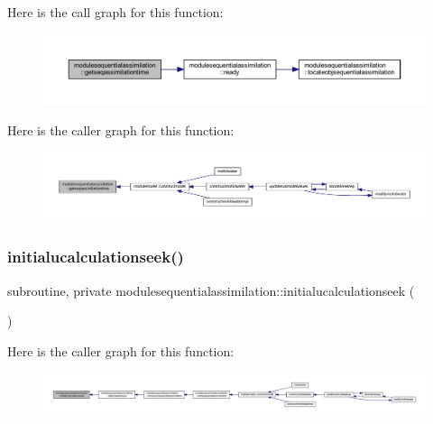 Here is the call graph for this function\+:\nopagebreak
\begin{figure}[H]
\begin{center}
\leavevmode
\includegraphics[width=350pt]{namespacemodulesequentialassimilation_a79adcfc8fb983a24237bd6bba818eca8_cgraph}
\end{center}
\end{figure}
Here is the caller graph for this function\+:\nopagebreak
\begin{figure}[H]
\begin{center}
\leavevmode
\includegraphics[width=350pt]{namespacemodulesequentialassimilation_a79adcfc8fb983a24237bd6bba818eca8_icgraph}
\end{center}
\end{figure}
\mbox{\label{namespacemodulesequentialassimilation_a33c7157ae5930272ff775ccd732bcb33}} 
\subsubsection{\texorpdfstring{initialucalculationseek()}{initialucalculationseek()}}
{\footnotesize\ttfamily subroutine, private modulesequentialassimilation\+::initialucalculationseek (\begin{DoxyParamCaption}{ }\end{DoxyParamCaption})\hspace{0.3cm}{\ttfamily [private]}}

Here is the caller graph for this function\+:\nopagebreak
\begin{figure}[H]
\begin{center}
\leavevmode
\includegraphics[width=350pt]{namespacemodulesequentialassimilation_a33c7157ae5930272ff775ccd732bcb33_icgraph}
\end{center}
\end{figure}
\mbox{\label{namespacemodulesequentialassimilation_a7077ed60ddc61ad6d71f0df6d63bd587}} 
